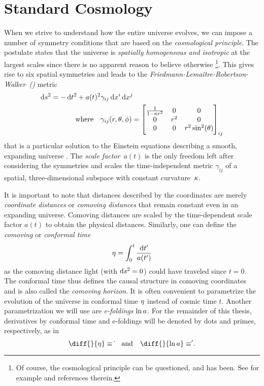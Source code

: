 \section{Standard \FLRW{} Cosmology}\label{sec:frw}

When we strive to understand how the entire universe evolves, we can impose a number of symmetry conditions that are based on the \emph{cosmological principle}. The postulate states that the universe is \emph{spatially homogeneous and isotropic} at the largest scales since there is no apparent reason to believe otherwise \footnote{Of course, the cosmological principle can be questioned, and has been. See for example \textcite{Schwarz2015} and references therein.}. This gives rise to six spatial symmetries and leads to the \emph{Friedmann-Lemaître-Robertson-Walker~(\FLRW{})} metric%
\begin{subequations}%
\begin{align}%
	\dif{s}^2 = -\dif{t}^2 + a(t)^2 &\gamma_{ij} \dif{x^i}\dif{x^j} \\
	\text{where} \quad &\gamma_{ij}(r,\theta,\phi) =
	\begin{bmatrix}
		\frac{1}{1-\spatcurv r^2} & 0 & 0 \\
		0 & r^2 & 0 \\
		0 & 0 & r^2 \sin^2(\theta)
	\end{bmatrix}_{ij}
\end{align}
\end{subequations}
that is a particular solution to the Einstein equations describing a smooth, expanding universe \autocite{Dodelson,Schuller}. The \emph{scale factor}~\(a(t)\) is the only freedom left after considering the symmetries and scales the time-independent metric \(\gamma_{ij}\) of a spatial, three-dimensional subspace with constant curvature~\(\kappa\).

It is important to note that distances described by the \FLRW{} coordinates are merely \emph{coordinate distances} or \emph{comoving distances} that remain constant even in an expanding universe. Comoving distances are scaled by the time-dependent scale factor \(a(t)\) to obtain the physical distances. Similarly, one can define the \emph{comoving} or \emph{conformal time}
\begin{equation}
	\conft = \int_0^t \frac{\dif{t^\prime}}{a(t^\prime)}
\end{equation}
as the comoving distance light (with \(\dif{s}^2=0\)) could have traveled since \(t=0\). The conformal time thus defines the causal structure in comoving coordinates and is also called the \emph{comoving horizon}. It is often convenient to parametrize the evolution of the universe in conformal time \(\eta\) instead of cosmic time \(t\). Another parametrization we will use are \emph{e-foldings} \(\ln a\). For the remainder of this thesis, derivatives by conformal time and e-foldings will be denoted by dots and primes, respectively, as in
\begin{equation}
	\diff{}{\conft}\equiv\dconf{} \quad \text{and} \quad \diff{}{\efold}\equiv\defold{}
	\eqpunct{.}
\end{equation}

